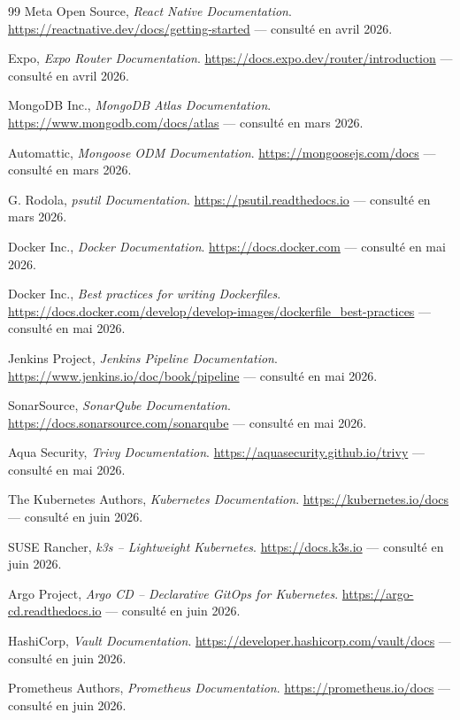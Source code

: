 \begin{thebibliography}{99}
Meta Open Source, \textit{React Native Documentation}.
\url{https://reactnative.dev/docs/getting-started} --- consulté en avril 2026.

Expo, \textit{Expo Router Documentation}.
\url{https://docs.expo.dev/router/introduction} --- consulté en avril 2026.

MongoDB Inc., \textit{MongoDB Atlas Documentation}.
\url{https://www.mongodb.com/docs/atlas} --- consulté en mars 2026.

Automattic, \textit{Mongoose ODM Documentation}.
\url{https://mongoosejs.com/docs} --- consulté en mars 2026.

G. Rodola, \textit{psutil Documentation}.
\url{https://psutil.readthedocs.io} --- consulté en mars 2026.

Docker Inc., \textit{Docker Documentation}.
\url{https://docs.docker.com} --- consulté en mai 2026.

Docker Inc., \textit{Best practices for writing Dockerfiles}.
\url{https://docs.docker.com/develop/develop-images/dockerfile_best-practices} ---
consulté en mai 2026.

Jenkins Project, \textit{Jenkins Pipeline Documentation}.
\url{https://www.jenkins.io/doc/book/pipeline} --- consulté en mai 2026.

SonarSource, \textit{SonarQube Documentation}.
\url{https://docs.sonarsource.com/sonarqube} --- consulté en mai 2026.

Aqua Security, \textit{Trivy Documentation}.
\url{https://aquasecurity.github.io/trivy} --- consulté en mai 2026.

The Kubernetes Authors, \textit{Kubernetes Documentation}.
\url{https://kubernetes.io/docs} --- consulté en juin 2026.

SUSE Rancher, \textit{k3s -- Lightweight Kubernetes}.
\url{https://docs.k3s.io} --- consulté en juin 2026.

Argo Project, \textit{Argo CD -- Declarative GitOps for Kubernetes}.
\url{https://argo-cd.readthedocs.io} --- consulté en juin 2026.

HashiCorp, \textit{Vault Documentation}.
\url{https://developer.hashicorp.com/vault/docs} --- consulté en juin 2026.

Prometheus Authors, \textit{Prometheus Documentation}.
\url{https://prometheus.io/docs} --- consulté en juin 2026.


\end{thebibliography}
